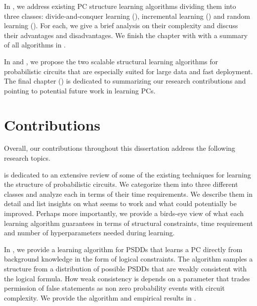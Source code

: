 In , we address existing PC structure learning algorithms dividing them into
three classes: divide-and-conquer learning (), incremental learning
() and random learning (). For each, we give a brief
analysis on their complexity and discuss their advantages and disadvantages. We finish the chapter
with with a summary of all algorithms in .

In  and , we propose the two scalable structural learning algorithms
for probabilistic circuits that are especially suited for large data and fast deployment.  The
final chapter () is dedicated to summarizing our research contributions and
pointing to potential future work in learning PCs.

\section{Contributions}

Overall, our contributions throughout this dissertation address the following research topics.


 is dedicated to an extensive review of some of the existing techniques for
learning the structure of probabilistic circuits. We categorize them into three different classes
and analyze each in terms of their time requirements. We describe them in detail and list insights
on what seems to work and what could potentially be improved. Perhaps more importantly, we provide
a birds-eye view of what each learning algorithm guarantees in terms of structural constraints,
time requirement and number of hyperparameters needed during learning.


In \citet{geh21a}, we provide a learning algorithm for PSDDs that learns a PC directly from
background knowledge in the form of logical constraints. The algorithm samples a structure from a
distribution of possible PSDDs that are weakly consistent with the logical formula. How weak
consistency is depends on a parameter that trades permission of false statements as non zero
probability events with circuit complexity. We provide the algorithm and empirical results in
.


